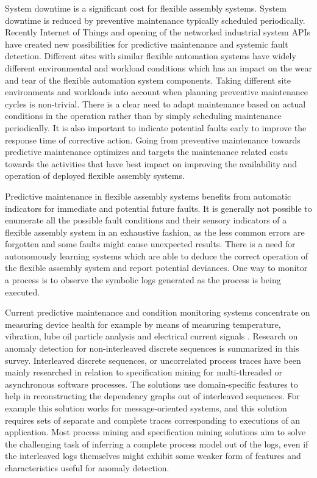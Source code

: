 \documentclass[journal]{IEEEtran}
\begin{document}
System downtime is a significant cost for flexible assembly systems. System downtime is reduced by preventive maintenance typically scheduled periodically.
Recently Internet of Things and opening of the networked industrial system APIs have created new possibilities for predictive maintenance and systemic fault detection. Different sites with similar
flexible automation systems have widely different environmental and workload conditions which has an impact on the wear and tear of the flexible automation system components.
Taking different site environments and workloads into account when planning preventive maintenance cycles is non-trivial. There is a clear need to adapt maintenance based on actual
conditions in the operation rather than by simply scheduling maintenance periodically\cite{hashemian2011state}.
It is also important to indicate potential faults early to improve the response time of corrective action.
Going from preventive maintenance towards predictive maintenance optimizes and targets the maintenance related costs towards the activities that have best impact
on improving the availability and operation of deployed flexible assembly systems.

Predictive maintenance in flexible assembly systems benefits from automatic indicators for immediate and potential future faults.
It is generally not possible to enumerate all the possible fault conditions and their sensory indicators of a flexible assembly system in an exhaustive fashion,
as the less common errors are forgotten and some faults might cause unexpected results\cite{camarinha1996integration}.
There is a need for autonomously learning systems which are able to deduce the correct operation of the flexible assembly system and report potential deviances. One way to monitor a process is to observe the symbolic
logs generated as the process is being executed.

Current predictive maintenance and condition monitoring systems concentrate on measuring device health for example by means of measuring temperature\cite{mobley2002introduction},
vibration\cite{scheffer2004practical}, lube oil particle analysis\cite{hunt1993handbook} and electrical current signals
\cite{thomson2001current}. Research on anomaly detection for non-interleaved discrete sequences is summarized in this survey\cite{chandola2012anomaly}.
Interleaved discrete sequences, or uncorrelated process traces have been mainly researched in relation to specification mining for multi-threaded or asynchronous software processes.
The solutions use domain-specific features to help in reconstructing the dependency graphs out of interleaved sequences. For example this solution works for message-oriented systems\cite{kumar2011mining},
and this solution requires sets of separate and complete traces corresponding to executions of an application\cite{mining-program-workflow-from-interleaved-traces}. Most process mining and specification mining
solutions aim to solve the challenging task of inferring a complete process model out of the logs, even if the interleaved logs themselves might exhibit some weaker form of features
and characteristics useful for anomaly detection.
\end{document}
